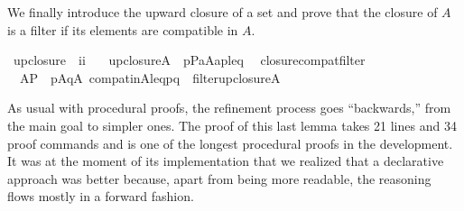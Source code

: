 We finally introduce the upward closure of a set
and prove that the closure of $A$ is a filter if its elements are
compatible in $A$.
\begin{isabelle}
\isamarkupfalse%
\ upclosure\ {\isacharcolon}{\isacharcolon}\ {\isachardoublequoteopen}i{\isasymRightarrow}i{\isachardoublequoteclose}\ \isanewline
\ \ {\isachardoublequoteopen}upclosure{\isacharparenleft}A{\isacharparenright}\ {\isacharequal}{\isacharequal}\ {\isacharbraceleft}p{\isasymin}P{\isachardot}{\isasymexists}a{\isasymin}A{\isachardot}{\isasymlangle}a{\isacharcomma}p{\isasymrangle}{\isasymin}leq{\isacharbraceright}{\isachardoublequoteclose}\isanewline
{}\isamarkupfalse%
\ \ closure{\isacharunderscore}compat{\isacharunderscore}filter{\isacharcolon}
\ \ {\isachardoublequoteopen}A{\isasymsubseteq}P\ {\isasymLongrightarrow}\ {\isacharparenleft}{\isasymforall}p{\isasymin}A{\isachardot}{\isasymforall}q{\isasymin}A{\isachardot}\ compat{\isacharunderscore}in{\isacharparenleft}A{\isacharcomma}leq{\isacharcomma}p{\isacharcomma}q{\isacharparenright}{\isacharparenright}\ {\isasymLongrightarrow}\ filter{\isacharparenleft}upclosure{\isacharparenleft}A{\isacharparenright}{\isacharparenright}{\isachardoublequoteclose}
\end{isabelle}
As usual
with procedural proofs, the refinement process goes ``backwards,''
from the main goal to simpler ones. The proof of this last lemma takes
21 lines and 34 proof commands and is one of the longest procedural
proofs in the development.  It was  at
the moment of its implementation that we realized that a declarative
approach was better because, apart from being more readable, the
reasoning flows mostly in a forward fashion.



